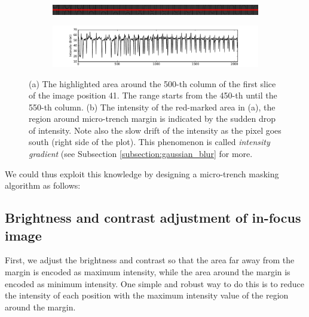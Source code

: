 \documentclass[pdftex,12pt,a4paper]{report}
\begin{document}
\begin{figure}[H]
\centering

\begin{subfigure}{0.8\textwidth}
  \centering
  \includegraphics[width=\textwidth]{images/pos_41_cut_highlight_y_500}
  \caption{}
  \label{fig:pos41_highlight}
\end{subfigure}%

\begin{subfigure}{\textwidth}
  \centering
  \includegraphics[width=\textwidth]{images/pos_41_cut_highlight_y_500_contrast}
  \caption{}
  \label{fig:pos41_contrast}
\end{subfigure}%
\caption[Example of intensity values along the vertical axis in an out-of-focus image]{(a) The highlighted area around the 500-th column of the first slice of the image position 41. The range starts from the 450-th until the 550-th column. (b) The intensity of the red-marked area in (a), the region around micro-trench margin is indicated by the sudden drop of intensity. Note also the slow drift of the intensity as the pixel goes south (right side of the plot). This phenomenon is called \textit{intensity gradient} (see Subsection \ref{subsection:gaussian_blur} for more.}
\label{fig:pos41_brightness}
\end{figure}

We could thus exploit this knowledge by designing a micro-trench masking algorithm as follows:

\subsection{Brightness and contrast adjustment of in-focus image}
\label{subsubsection:brightness_contrast_adjustment}

First, we adjust the brightness and contrast so that the area far away from the margin is encoded as maximum intensity, while the area around the margin is encoded as minimum intensity. One simple and robust way to do this is to reduce the intensity of each position with the maximum intensity value of the region around the margin.
\end{document}
